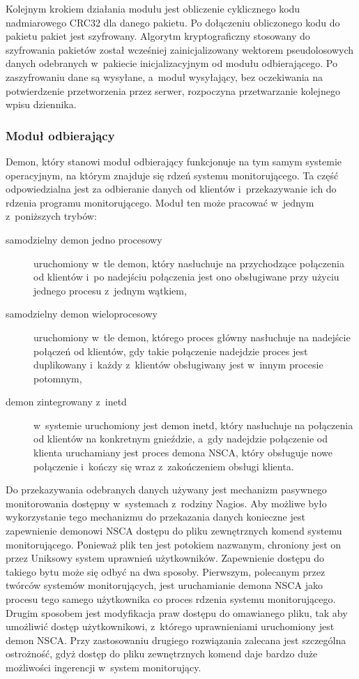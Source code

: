 Kolejnym krokiem działania modułu jest obliczenie cyklicznego kodu
nadmiarowego CRC32 dla danego pakietu. Po dołączeniu obliczonego kodu
do pakietu pakiet jest szyfrowany. Algorytm kryptograficzny stosowany do
szyfrowania pakietów został wcześniej zainicjalizowany wektorem
pseudolosowych danych odebranych w~pakiecie inicjalizacyjnym od modułu
odbierającego. Po zaszyfrowaniu dane są wysyłane, a~moduł wysyłający,
bez oczekiwania na potwierdzenie przetworzenia przez serwer,
rozpoczyna przetwarzanie kolejnego wpisu dziennika.

\subsubsection[Moduł odbierający][Moduł odbierający]{Moduł odbierający}

Demon, który stanowi moduł odbierający funkcjonuje na tym samym
systemie operacyjnym, na którym znajduje się rdzeń systemu
monitorującego. Ta część odpowiedzialna jest za odbieranie danych od
klientów i~przekazywanie ich do rdzenia programu monitorującego. Moduł
ten może pracować w~jednym z~poniższych trybów:

\begin{description}
\item[samodzielny demon jedno procesowy] uruchomiony w~tle demon, który
  nasłuchuje na przychodzące połączenia od klientów i~po nadejściu
  połączenia jest ono obsługiwane przy użyciu jednego procesu z~jednym
  wątkiem,
\item[samodzielny demon wieloprocesowy] uruchomiony w~tle demon,
  którego proces główny nasłuchuje na nadejście połączeń od klientów,
  gdy takie połączenie nadejdzie proces jest duplikowany i~każdy
  z~klientów obsługiwany jest w~innym procesie potomnym,
\item[demon zintegrowany z~inetd] w~systemie uruchomiony jest demon
  inetd, który nasłuchuje na połączenia od klientów na konkretnym
  gnieździe, a~gdy nadejdzie połączenie od klienta uruchamiany jest
  proces demona NSCA, który obsługuje nowe połączenie i~kończy się
  wraz z~zakończeniem obsługi klienta.
\end{description}

Do przekazywania odebranych danych używany jest mechanizm pasywnego
monitorowania dostępny w~systemach z~rodziny Nagios. Aby możliwe było
wykorzystanie tego mechanizmu do przekazania danych konieczne jest
zapewnienie demonowi NSCA dostępu do pliku zewnętrznych komend systemu
monitorującego. Ponieważ plik ten jest potokiem
nazwanym, chroniony jest on przez Uniksowy system uprawnień
użytkowników. Zapewnienie dostępu do takiego bytu może się odbyć na
dwa sposoby. Pierwszym, polecanym przez twórców systemów
monitorujących, jest uruchamianie demona NSCA jako procesu tego samego
użytkownika co proces rdzenia systemu monitorującego. Drugim sposobem
jest modyfikacja praw dostępu do omawianego pliku, tak aby umożliwić
dostęp użytkownikowi, z~którego uprawnieniami uruchomiony jest demon
NSCA. Przy zastosowaniu drugiego rozwiązania zalecana jest szczególna
ostrożność, gdyż dostęp do pliku zewnętrznych komend daje bardzo duże
możliwości ingerencji w~system monitorujący.

